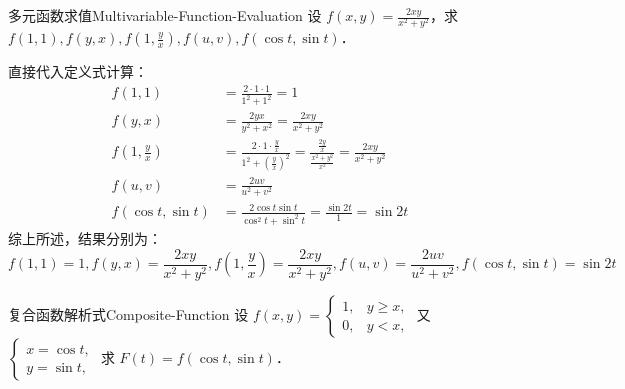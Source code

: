 \begin{problem}{多元函数求值}{Multivariable-Function-Evaluation}
    设 $f(x, y) = \frac{2xy}{x^2+y^2}$，求 $f(1, 1), f(y, x), f(1, \frac{y}{x}), f(u, v), f(\cos t, \sin t)$．
\end{problem}

\begin{solution}
    直接代入定义式计算：
    \begin{equation}
        \begin{aligned}
            f(1, 1)                        & = \frac{2 \cdot 1 \cdot 1}{1^2 + 1^2} = 1                                                                                                     \\
            f(y, x)                        & = \frac{2yx}{y^2 + x^2} = \frac{2xy}{x^2 + y^2}                                                                                               \\
            f\left( 1, \frac{y}{x} \right) & = \frac{2 \cdot 1 \cdot \frac{y}{x}}{1^2 + \left( \frac{y}{x} \right)^2} = \frac{\frac{2y}{x}}{\frac{x^2 + y^2}{x^2}} = \frac{2xy}{x^2 + y^2} \\
            f(u, v)                        & = \frac{2uv}{u^2 + v^2}                                                                                                                       \\
            f(\cos t, \sin t)              & = \frac{2\cos t \sin t}{\cos^2 t + \sin^2 t} = \frac{\sin 2t}{1} = \sin 2t
        \end{aligned}
    \end{equation}
    综上所述，结果分别为：
    \begin{equation}
        \boxed{f(1, 1) = 1, f(y, x) = \frac{2xy}{x^2+y^2}, f\left( 1, \frac{y}{x} \right) = \frac{2xy}{x^2+y^2}, f(u, v) = \frac{2uv}{u^2+v^2}, f(\cos t, \sin t) = \sin 2t}
    \end{equation}
\end{solution}

\begin{problem}{复合函数解析式}{Composite-Function}
    设 $f(x, y) = \begin{cases} 1, & y \geqslant x, \\ 0, & y < x, \end{cases}$ 又 $\begin{cases} x = \cos t, \\ y = \sin t, \end{cases}$ 求 $F(t) = f(\cos t, \sin t)$．
\end{problem}

